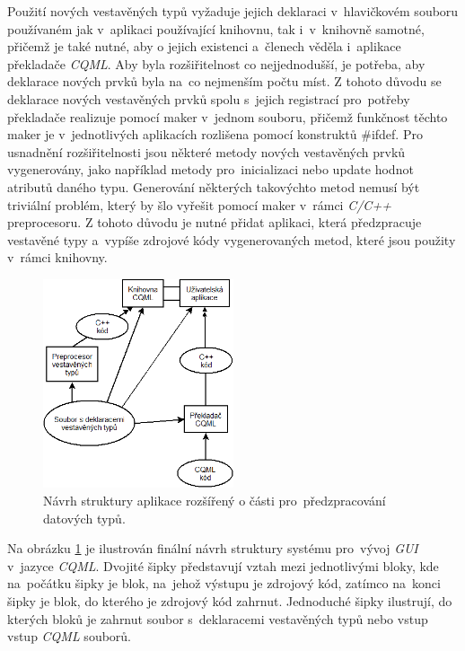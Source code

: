 \documentclass[11pt,twoside,a4paper]{book}
\begin{document}
Použití nových vestavěných typů vyžaduje jejich deklaraci v~hlavičkovém souboru používaném jak v~aplikaci používající knihovnu, tak i~v~knihovně samotné, přičemž je také nutné, aby o jejich existenci a~členech věděla i~aplikace překladače \textit{CQML}. Aby byla rozšiřitelnost co nejjednodušší, je potřeba, aby deklarace nových prvků byla na~co nejmenším počtu míst. Z tohoto důvodu se deklarace nových vestavěných prvků spolu s~jejich registrací pro~potřeby překladače realizuje pomocí maker v~jednom souboru, přičemž funkčnost těchto maker je v~jednotlivých aplikacích rozlišena pomocí konstruktů \#ifdef.
Pro usnadnění rozšiřitelnosti jsou některé metody nových vestavěných prvků vygenerovány, jako například metody pro~inicializaci nebo update hodnot atributů daného typu. Generování některých takovýchto metod nemusí být triviální problém, který by šlo vyřešit pomocí maker v~rámci \textit{C/C++} preprocesoru. Z tohoto důvodu je nutné přidat aplikaci, která předzpracuje vestavěné typy a~vypíše zdrojové kódy vygenerovaných metod, které jsou použity v~rámci knihovny.\\
\begin{figure}[!ht]
\begin{center}
  \includegraphics[width=0.5\textwidth]{figures/Diagram2}
\caption{{\label{fig:structure2}}Návrh struktury aplikace rozšířený o části pro~předzpracování datových typů.}
\end{center}
\end{figure}
Na obrázku \ref{fig:structure2} je ilustrován finální návrh struktury systému pro~vývoj \textit{GUI} v~jazyce \textit{CQML}. Dvojité šipky představují vztah mezi jednotlivými bloky, kde na~počátku šipky je blok, na~jehož výstupu je zdrojový kód, zatímco na~konci šipky je blok, do kterého je zdrojový kód zahrnut. Jednoduché šipky ilustrují, do kterých bloků je zahrnut soubor s~deklaracemi vestavěných typů nebo vstup vstup \textit{CQML} souborů.
\end{document}
